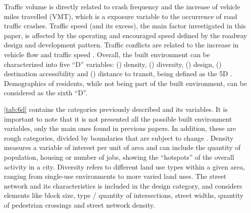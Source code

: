 Traffic volume is directly related to crash frequency and the increase of vehicle miles travelled (VMT), which is a exposure variable to the occurrence of road traffic crashes. Traffic speed (and its excess), the main factor investigated in this paper, is affected by the operating and encouraged speed defined by the roadway design and development pattern. Traffic conflicts are related to the increase in vehicle flow and traffic speed \cite{Ewing2009}. Overall, the built environment can be characterized into five ``D'' variables: () density, () diversity, () design, () destination accessibility and () distance to transit, being defined as the 5D \cite{Ewing2010}. Demographics of residents, while not being part of the built environment, can be considered as the sixth ``D''. 





\autoref{tab:6d} contains the categories previously described and its variables. It is important to note that it is not presented all the possible built environment variables, only the main ones found in previous papers. In addition, these are rough categories, divided by boundaries that are subject to change \cite{Ewing2010}. Density measures a variable of interest per unit of area and can include the quantity of population, housing or number of jobs, showing the ``hotspots'' of the overall activity in a city. Diversity refers to different land use types within a given area, ranging from single-use environments to more varied land uses. The street network and its characteristics is included in the design category, and considers elements like block size, type / quantity of intersections, street widths, quantity of pedestrian crossings and street network density.

